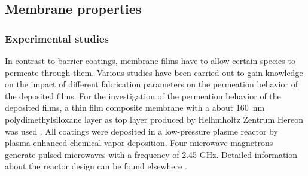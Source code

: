 \documentclass[AMA,STIX2COL]{WileyNJD-v2} %
\begin{document}

\subsection{Membrane properties }\label{subsubsec42}

\subsubsection{Experimental studies}
In contrast to barrier coatings, membrane films have to allow certain species to permeate through them. Various studies have been carried out to gain knowledge on the impact of different fabrication parameters on the permeation behavior of the deposited films.
For the investigation of the permeation behavior of the deposited films, a thin film composite membrane with a about 160~nm polydimethylsiloxane layer as top layer produced by Helhmholtz Zentrum Hereon was used \cite{yave2010nanometric}. All coatings were deposited in a low-pressure plasme reactor by plasma-enhanced chemical vapor deposition. Four microwave magnetrons generate pulsed microwaves with a frequency of 2.45 GHz. Detailed information about the reactor design can be found elsewhere \cite{jaritz2020hmdso}.
\end{document}
